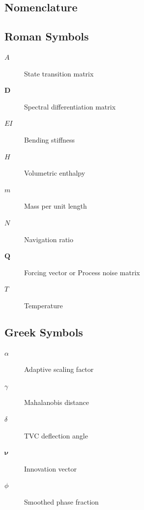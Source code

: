 \documentclass[11pt,a4paper]{article}
\theoremstyle{definition}
\numberwithin{equation}{section}
\begin{document}
\begin{appendices}
\section{Nomenclature}
\label{app:nomenclature}

\subsection{Roman Symbols}
\begin{description}
    \item[$A$] State transition matrix
    \item[$\mathbf{D}$] Spectral differentiation matrix
    \item[$EI$] Bending stiffness
    \item[$H$] Volumetric enthalpy
    \item[$m$] Mass per unit length
    \item[$N$] Navigation ratio
    \item[$\mathbf{Q}$] Forcing vector or Process noise matrix
    \item[$T$] Temperature
\end{description}

\subsection{Greek Symbols}
\begin{description}
    \item[$\alpha$] Adaptive scaling factor
    \item[$\gamma$] Mahalanobis distance
    \item[$\delta$] TVC deflection angle
    \item[$\boldsymbol{\nu}$] Innovation vector
    \item[$\phi$] Smoothed phase fraction
\end{description}

\end{appendices}
\end{document}
